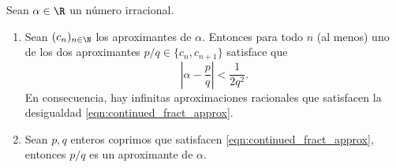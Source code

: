\documentclass[teoria-numeros.tex]{subfiles}
\begin{document}
\begin{thm}\label{thm:approximants_satisfy_approx}
	Sean $\alpha \in \R$ un número irracional.
	\begin{enumerate}
		\item Sean $(c_n)_{n\in\N}$ los aproximantes de $\alpha$.
			Entonces para todo $n$ (al menos) uno de los dos aproximantes $p/q \in \{ c_n, c_{n+1} \}$ satisface que
			\begin{equation}
				\left| \alpha - \frac{p}{q} \right| < \frac{1}{2q^2}.
				\label{eqn:continued_fract_approx}
			\end{equation}
			En consecuencia, hay infinitas aproximaciones racionales que satisfacen la desigualdad \eqref{eqn:continued_fract_approx}.

		\item Sean $p, q$ enteros coprimos que satisfacen \eqref{eqn:continued_fract_approx}, entonces $p/q$ es un aproximante de $\alpha$.
	\end{enumerate}
\end{thm}
\end{document}
